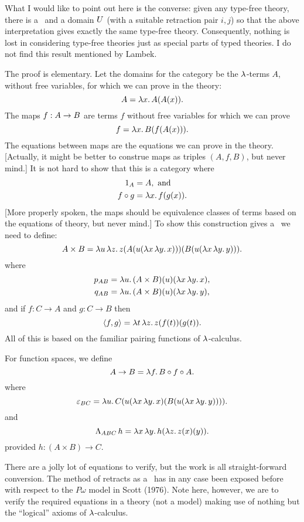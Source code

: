 What I would like to point out here is the converse: given any type-free theory, there is
a \ccc\ and a domain $U$ (with a suitable retraction pair $i,j$) so that the above
interpretation gives exactly the same type-free theory. Consequently, nothing is lost in
considering type-free theories just as special parts of typed theories. I do not find this
result mentioned by Lambek.

The proof is elementary. Let the domains for the category be the $\lambda$-terms $A$, without
free variables, for which we can prove in the theory:
$$
A = \lm{x}. A(A(x)).
$$
The maps $f: A \rightarrow B$ are terms $f$ without free variables for which we can prove
$$
f = \lm{x}. B(f(A(x))).
$$
The equations between maps are the equations we can prove in the theory. [Actually, it
might be better to construe maps as triples $(A,f,B)$, but never mind.] It is not hard to
show that this is a category where
\begin{align*}
\id_A &= A, {\textrm{ and}}\\
f \comp g &= \lm{x}. f(g(x)).
\end{align*}
[More properly spoken, the maps should be equivalence classes of terms based on the
equations of theory, but never mind.] To show this construction gives a \ccc\ we need to
define:
$$
A \times B = \lmm{u}{z}.z(A(u(\lxy x))) (B(u(\lxy y))).
$$
where
\begin{align*}
p_{AB} &= \lm{u}. (A \times B)(u)(\lxy x),\\
q_{AB} &= \lm{u}. (A \times B)(u)(\lxy y),
\end{align*}
%
and if $f:C\to A$ and $g: C\to B$ then
$$
\langle f,g \rangle = \lmm{t}{z}.z(f(t))(g(t)).
$$
All of this is based on the familiar pairing functions of $\lambda$-calculus.

For function spaces, we define
$$
\AB = \lm{f}. B \comp f \comp A.
$$
where
$$
\ebc = \lm{u}. C(u(\lxy x)(B(u(\lxy y)))).
$$
and
$$
\L_{ABC}\, h = \lxy h(\lm{z}. z(x)(y)).
$$
provided $h: (A \times B) \to C$.

There are a jolly lot of equations to verify, but the work is all straight-forward
conversion. The method of retracts as a \ccc\ has in any case been exposed before with
respect to the $P\omega$ model in Scott (1976). Note here, however, we are to verify the
required equations in a theory (not a model) making use of nothing but the ``logical''
axioms of $\lambda$-calculus.

